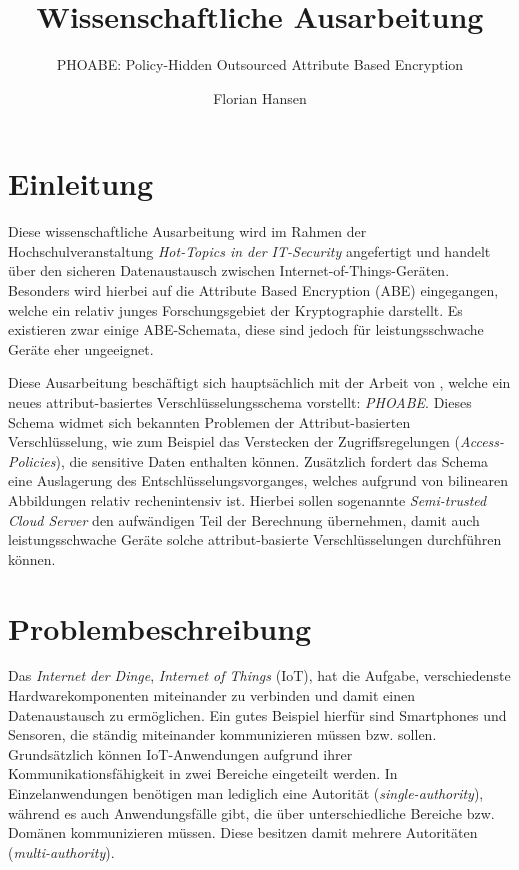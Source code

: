 \documentclass[format=sigconf]{acmart}
\title{Wissenschaftliche Ausarbeitung}
\subtitle{PHOABE: Policy-Hidden Outsourced Attribute Based Encryption}
\author{Florian Hansen}
\affiliation{
	680169,
  \institution{Hochschule Flensburg}
}
\begin{document}
	\begin{abstract}
	\end{abstract}
	\maketitle

	\section{Einleitung}
	Diese wissenschaftliche Ausarbeitung wird im Rahmen der
	Hochschulveranstaltung \textit{Hot-Topics in der IT-Security} angefertigt und
	handelt über den sicheren Datenaustausch zwischen Internet-of-Things-Geräten.
	Besonders wird hierbei auf die Attribute Based Encryption (ABE) eingegangen,
	welche ein relativ junges Forschungsgebiet der Kryptographie darstellt. Es
	existieren zwar einige ABE-Schemata, diese sind jedoch für leistungsschwache
	Geräte eher ungeeignet.

	Diese Ausarbeitung beschäftigt sich hauptsächlich mit der Arbeit von
	\cite{phoabe}, welche ein neues attribut-basiertes Verschlüsselungsschema
	vorstellt: \textit{PHOABE}. Dieses Schema widmet sich bekannten Problemen der
	Attribut-basierten Verschlüsselung, wie zum Beispiel das Verstecken der
	Zugriffsregelungen (\textit{Access-Policies}), die sensitive Daten enthalten
	können. Zusätzlich fordert das Schema eine Auslagerung des
	Entschlüsselungsvorganges, welches aufgrund von bilinearen Abbildungen relativ
	rechenintensiv ist. Hierbei sollen sogenannte \textit{Semi-trusted Cloud
	Server} den aufwändigen Teil der Berechnung übernehmen, damit auch
	leistungsschwache Geräte solche attribut-basierte Verschlüsselungen
	durchführen können.

	\section{Problembeschreibung}
	Das \textit{Internet der Dinge}, \textit{Internet of Things} (IoT), hat die
	Aufgabe, verschiedenste Hardwarekomponenten miteinander zu verbinden und damit
	einen Datenaustausch zu ermöglichen. Ein gutes Beispiel hierfür sind
	Smartphones und Sensoren, die ständig miteinander kommunizieren müssen bzw.
	sollen. Grundsätzlich können IoT-Anwendungen aufgrund ihrer
	Kommunikationsfähigkeit in zwei Bereiche eingeteilt werden. In
	Einzelanwendungen benötigen man lediglich eine Autorität
	(\textit{single-authority}), während es auch Anwendungsfälle gibt, die über
	unterschiedliche Bereiche bzw. Domänen kommunizieren müssen. Diese besitzen
	damit mehrere Autoritäten (\textit{multi-authority}).
\end{document}
